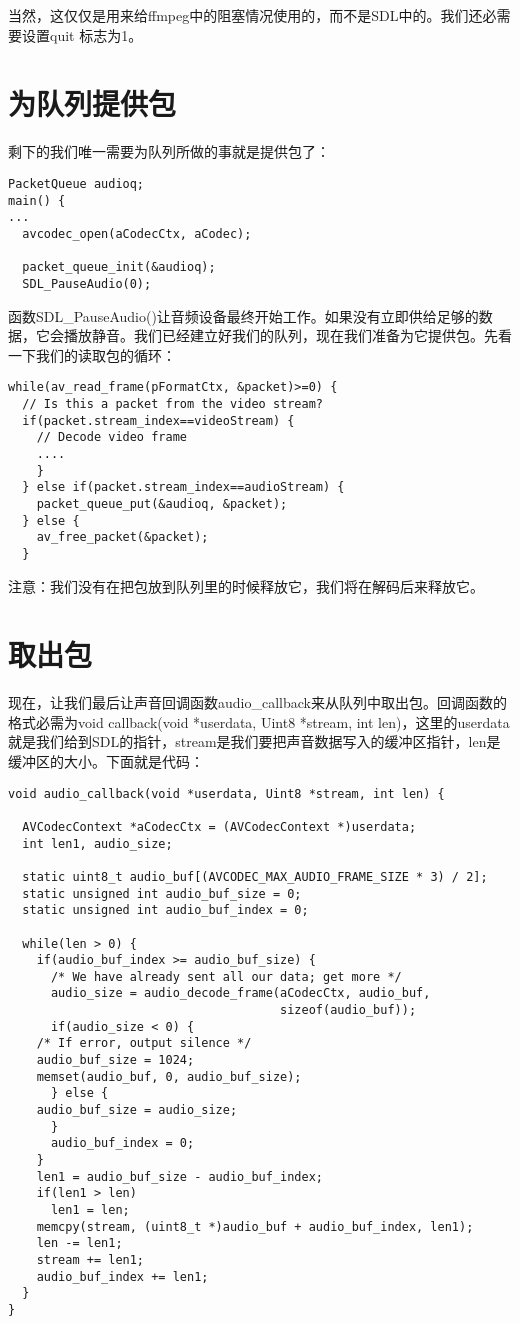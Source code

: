 当然，这仅仅是用来给ffmpeg中的阻塞情况使用的，而不是SDL中的。我们还必需要设置quit 标志为1。

\section{为队列提供包}


剩下的我们唯一需要为队列所做的事就是提供包了：

\begin{lstlisting}
PacketQueue audioq;
main() {
...
  avcodec_open(aCodecCtx, aCodec);

  packet_queue_init(&audioq);
  SDL_PauseAudio(0);
\end{lstlisting}

函数SDL_PauseAudio()让音频设备最终开始工作。如果没有立即供给足够的数据，它会播放静音。我们已经建立好我们的队列，现在我们准备为它提供包。先看一下我们的读取包的循环：

\begin{lstlisting}
while(av_read_frame(pFormatCtx, &packet)>=0) {
  // Is this a packet from the video stream?
  if(packet.stream_index==videoStream) {
    // Decode video frame
    ....
    }
  } else if(packet.stream_index==audioStream) {
    packet_queue_put(&audioq, &packet);
  } else {
    av_free_packet(&packet);
  }
\end{lstlisting}

注意：我们没有在把包放到队列里的时候释放它，我们将在解码后来释放它。

\section{取出包}

现在，让我们最后让声音回调函数audio_callback来从队列中取出包。回调函数的格式必需为void callback(void *userdata, Uint8 *stream, int len)，这里的userdata就是我们给到SDL的指针，stream是我们要把声音数据写入的缓冲区指针，len是缓冲区的大小。下面就是代码：

\begin{lstlisting}
void audio_callback(void *userdata, Uint8 *stream, int len) {

  AVCodecContext *aCodecCtx = (AVCodecContext *)userdata;
  int len1, audio_size;

  static uint8_t audio_buf[(AVCODEC_MAX_AUDIO_FRAME_SIZE * 3) / 2];
  static unsigned int audio_buf_size = 0;
  static unsigned int audio_buf_index = 0;

  while(len > 0) {
    if(audio_buf_index >= audio_buf_size) {
      /* We have already sent all our data; get more */
      audio_size = audio_decode_frame(aCodecCtx, audio_buf,
                                      sizeof(audio_buf));
      if(audio_size < 0) {
    /* If error, output silence */
    audio_buf_size = 1024;
    memset(audio_buf, 0, audio_buf_size);
      } else {
    audio_buf_size = audio_size;
      }
      audio_buf_index = 0;
    }
    len1 = audio_buf_size - audio_buf_index;
    if(len1 > len)
      len1 = len;
    memcpy(stream, (uint8_t *)audio_buf + audio_buf_index, len1);
    len -= len1;
    stream += len1;
    audio_buf_index += len1;
  }
}
\end{lstlisting}


